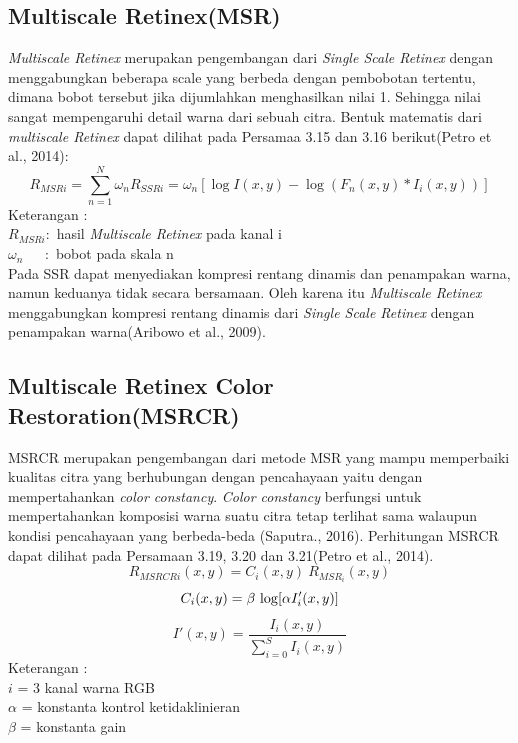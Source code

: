 \subsection{Multiscale Retinex(MSR)}
\emph{Multiscale Retinex} merupakan pengembangan dari \emph{Single Scale Retinex} dengan menggabungkan beberapa scale  yang berbeda dengan pembobotan tertentu, dimana bobot tersebut jika dijumlahkan menghasilkan nilai 1. Sehingga nilai  sangat mempengaruhi detail warna dari sebuah citra. Bentuk matematis dari \emph{multiscale Retinex} dapat dilihat pada Persamaa 3.15 dan 3.16 berikut(Petro et al., 2014):
\begin{equation}
R_{MSRi} = \sum_{n=1}^{N} \omega_n R_{SSRi}=\omega_n [\log I(x,y) - \log (F_n(x,y) * I_i(x,y))]
\end{equation}
Keterangan :
\\
\(R_{MSRi} : \) hasil \emph{Multiscale Retinex} pada kanal i
\\
\(\omega_n \ \ \ \ \ \ \ : \) bobot pada skala n\\
Pada SSR dapat menyediakan kompresi rentang dinamis dan penampakan warna, namun keduanya tidak secara bersamaan. Oleh karena itu \emph{Multiscale Retinex} menggabungkan kompresi rentang dinamis dari \emph{Single Scale Retinex} dengan penampakan warna(Aribowo et al., 2009).
\subsection{Multiscale Retinex Color Restoration(MSRCR)}
MSRCR merupakan pengembangan dari metode MSR yang mampu memperbaiki kualitas citra yang berhubungan dengan pencahayaan yaitu dengan mempertahankan \emph{color constancy}. \emph{Color constancy} berfungsi untuk mempertahankan komposisi warna suatu citra tetap terlihat sama walaupun kondisi pencahayaan yang berbeda-beda (Saputra., 2016). Perhitungan MSRCR dapat dilihat pada Persamaan 3.19, 3.20 dan 3.21(Petro et al., 2014).
\begin{equation}
	R_{MSRCRi}(x,y) = C_i(x,y) \ R_{MSR_i}(x,y)	
\end{equation}
\begin{equation}
	C_i(x,y) = \beta \ {\log[\alpha I'_i(x,y)]}\\
\end{equation}
\begin{equation}
I'(x,y) =\frac{I_i(x,y)}{\sum_{i=0}^{S}I_i(x,y)}
\end{equation}
\noindent Keterangan :\\
$i$ = 3 kanal warna RGB\\
$\alpha$ = konstanta kontrol ketidaklinieran\\
$\beta$ = konstanta gain\\

